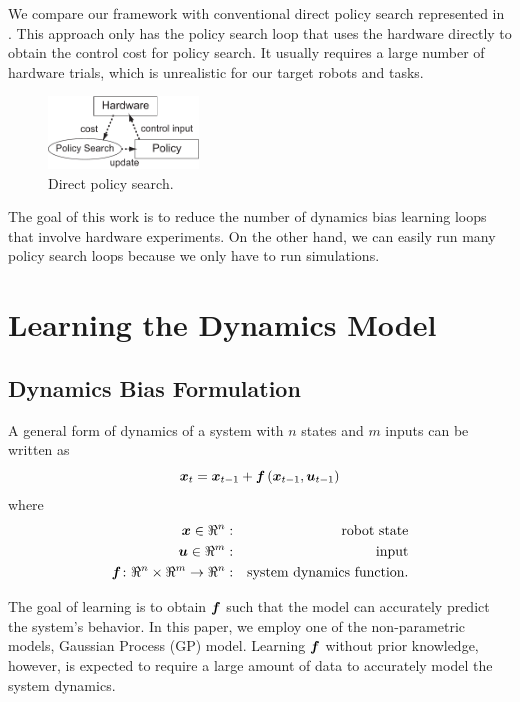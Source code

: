 We compare our framework with conventional direct policy search
represented in .
This approach only has the policy search loop that uses the hardware
directly to obtain the control cost for policy search.
It usually requires a large number of hardware trials, which
is unrealistic for our target robots and tasks.

\begin{figure}[tb]
\begin{center}
\includegraphics[width=40mm]{eps/direct_policy_search.pdf}
\caption{Direct policy search.}
\label{fig:learning_direct-policy-search}
\end{center}
\end{figure}

The goal of this work is to reduce the number of dynamics bias
learning loops that involve hardware experiments.
On the other hand, we can easily run many policy search loops because
we only have to run simulations.


\section{Learning the Dynamics Model} \label{sec:learning_model-learning}

\subsection{Dynamics Bias Formulation}

A general form of dynamics of a system with $n$ states and $m$ inputs
can be written as 
\begin{equation}
\mbox{\boldmath \(x\)}_t = \mbox{\boldmath \(x\)}_{t-1} + \mbox{\boldmath \(f\)}\left(\mbox{\boldmath \(x\)}_{t-1},
\mbox{\boldmath \(u\)}_{t-1}\right)
\end{equation}
where
\begin{eqnarray*}
\mbox{\boldmath \(x\)}\in \Re^{n} &: & \mbox{robot state}\\
\mbox{\boldmath \(u\)}\in \Re^{m} &: & \mbox{input}\\
\mbox{\boldmath \(f\)}\colon \Re^{n}\times\Re^{m}\rightarrow \Re^{n} &: & \mbox{system dynamics function}.
\end{eqnarray*}

The goal of learning is to obtain $\mbox{\boldmath \(f\)}$ such
that the model can accurately predict the system's behavior.
In this paper, we employ one of the non-parametric models, Gaussian
Process (GP) model.
Learning $\mbox{\boldmath \(f\)}$ without prior knowledge, however, is expected to
require a large amount of data to accurately model the system dynamics.

